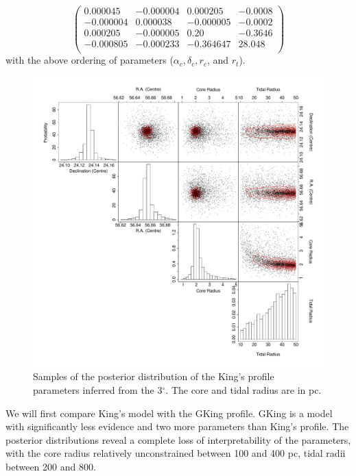 $$
\left(\begin{array}{rrrr}
 0.000045   & -0.000004  &  0.000205  & -0.0008  \\
-0.000004   &  0.000038  & -0.000005  & -0.0002  \\
 0.000205   & -0.000005  &  0.20      & -0.3646  \\
-0.000805   & -0.000233  & -0.364647  &  28.048  \\
\end{array}\right)
$$
with the above ordering of parameters ($\alpha_c, \delta_c, r_c$, and $r_t$). 

\begin{figure}[htbp]
\begin{center}
\includegraphics[width=\textwidth]{background/Figures/PSD/King7.pdf}
\caption{Samples of the posterior distribution of the King's profile parameters inferred from the 3$^{\circ}$. The core and tidal radius are in pc. }
\label{fig:King_7}
\end{center}
\end{figure}


We will first compare King's model with the GKing profile. GKing is a model with significantly less evidence and two more parameters than King's profile. The posterior distributions reveal a complete loss of interpretability of the parameters, with the core radius relatively unconstrained between 100 and 400 pc, tidal radii between 200 and 800. %

